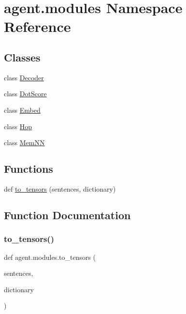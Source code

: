 \hypertarget{namespaceagent_1_1modules}{}\section{agent.\+modules Namespace Reference}
\label{namespaceagent_1_1modules}
\subsection*{Classes}
\begin{DoxyCompactItemize}
\item 
class \hyperlink{classagent_1_1modules_1_1Decoder}{Decoder}
\item 
class \hyperlink{classagent_1_1modules_1_1DotScore}{Dot\+Score}
\item 
class \hyperlink{classagent_1_1modules_1_1Embed}{Embed}
\item 
class \hyperlink{classagent_1_1modules_1_1Hop}{Hop}
\item 
class \hyperlink{classagent_1_1modules_1_1MemNN}{Mem\+NN}
\end{DoxyCompactItemize}
\subsection*{Functions}
\begin{DoxyCompactItemize}
\item 
def \hyperlink{namespaceagent_1_1modules_ab14a28f51a478876887e38d054c142dc}{to\+\_\+tensors} (sentences, dictionary)
\end{DoxyCompactItemize}


\subsection{Function Documentation}
\mbox{\label{namespaceagent_1_1modules_ab14a28f51a478876887e38d054c142dc}} 
\subsubsection{\texorpdfstring{to\+\_\+tensors()}{to\_tensors()}}
{\footnotesize\ttfamily def agent.\+modules.\+to\+\_\+tensors (\begin{DoxyParamCaption}\item[{}]{sentences,  }\item[{}]{dictionary }\end{DoxyParamCaption})}




